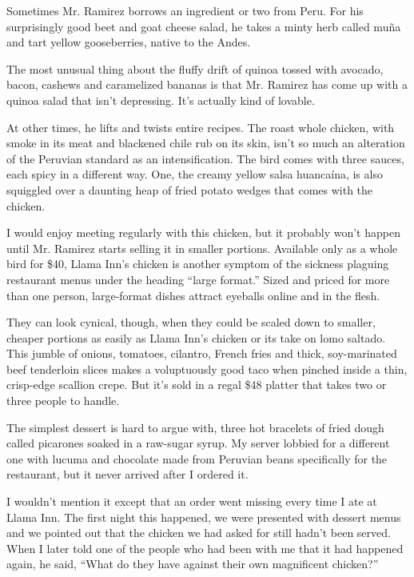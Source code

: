 Sometimes Mr. Ramirez borrows an ingredient or two from Peru. For his
surprisingly good beet and goat cheese salad, he takes a minty herb
called muña and tart yellow gooseberries, native to the Andes.

The most unusual thing about the fluffy drift of quinoa tossed with
avocado, bacon, cashews and caramelized bananas is that Mr. Ramirez has
come up with a quinoa salad that isn't depressing. It's actually kind of
lovable.

At other times, he lifts and twists entire recipes. The roast whole
chicken, with smoke in its meat and blackened chile rub on its skin,
isn't so much an alteration of the Peruvian standard as an
intensification. The bird comes with three sauces, each spicy in a
different way. One, the creamy yellow salsa huancaína, is also squiggled
over a daunting heap of fried potato wedges that comes with the chicken.

I would enjoy meeting regularly with this chicken, but it probably won't
happen until Mr. Ramirez starts selling it in smaller portions.
Available only as a whole bird for \$40, Llama Inn's chicken is another
symptom of the sickness plaguing restaurant menus under the heading
``large format.'' Sized and priced for more than one person,
large-format dishes attract eyeballs online and in the flesh.

They can look cynical, though, when they could be scaled down to
smaller, cheaper portions as easily as Llama Inn's chicken or its take
on lomo saltado. This jumble of onions, tomatoes, cilantro, French fries
and thick, soy-marinated beef tenderloin slices makes a voluptuously
good taco when pinched inside a thin, crisp-edge scallion crepe. But
it's sold in a regal \$48 platter that takes two or three people to
handle.

The simplest dessert is hard to argue with, three hot bracelets of fried
dough called picarones soaked in a raw-sugar syrup. My server lobbied
for a different one with lucuma and chocolate made from Peruvian beans
specifically for the restaurant, but it never arrived after I ordered
it.

I wouldn't mention it except that an order went missing every time I ate
at Llama Inn. The first night this happened, we were presented with
dessert menus and we pointed out that the chicken we had asked for still
hadn't been served. When I later told one of the people who had been
with me that it had happened again, he said, ``What do they have against
their own magnificent chicken?''

